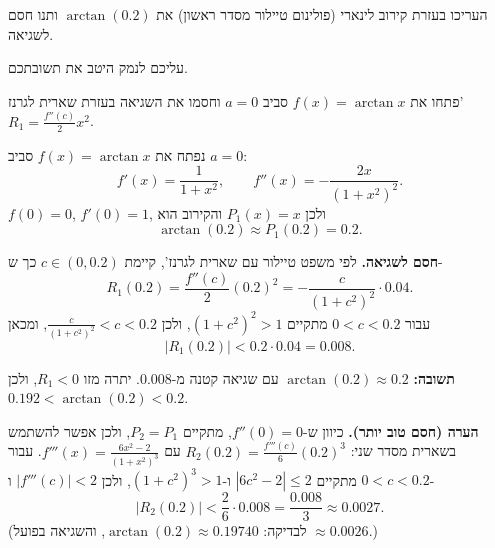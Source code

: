 
\begin{question}
העריכו בעזרת קירוב לינארי (פולינום טיילור מסדר ראשון) את $\arctan(0.2)$ ותנו חסם לשגיאה.

עליכם לנמק היטב את תשובתכם.
\end{question}

\begin{hint}
פתחו את $f(x)=\arctan x$ סביב $a=0$ וחסמו את השגיאה בעזרת שארית לגרנז' $R_1=\frac{f''(c)}{2}x^2$.
\end{hint}

\begin{solution}
נפתח את $f(x)=\arctan x$ סביב $a=0$:
\[ f'(x)=\frac{1}{1+x^2},\qquad f''(x)=-\frac{2x}{(1+x^2)^2}. \]
$f(0)=0$, $f'(0)=1$, ולכן $P_1(x)=x$ והקירוב הוא
\[ \arctan(0.2)\approx P_1(0.2)=\boxed{0.2}. \]

\textbf{חסם לשגיאה.} לפי משפט טיילור עם שארית לגרנז', קיימת $c\in(0,0.2)$ כך ש-
\[ R_1(0.2)=\frac{f''(c)}{2}(0.2)^2=-\frac{c}{(1+c^2)^2}\cdot0.04. \]
עבור $0<c<0.2$ מתקיים $(1+c^2)^2>1$, ולכן $\frac{c}{(1+c^2)^2}<c<0.2$, ומכאן
\[ |R_1(0.2)|<0.2\cdot0.04=0.008. \]

\textbf{תשובה:} $\arctan(0.2)\approx0.2$ עם שגיאה קטנה מ-$0.008$. יתרה מזו $R_1<0$, ולכן $0.192<\arctan(0.2)<0.2$.

\textbf{הערה (חסם טוב יותר).} כיוון ש-$f''(0)=0$, מתקיים $P_2=P_1$, ולכן אפשר להשתמש בשארית מסדר שני: $R_2(0.2)=\frac{f'''(c)}{6}(0.2)^3$ עם $f'''(x)=\frac{6x^2-2}{(1+x^2)^3}$. עבור $0<c<0.2$ מתקיים $|6c^2-2|\le 2$ ו-$(1+c^2)^3>1$, ולכן $|f'''(c)|<2$ ו-
\[ |R_2(0.2)|<\frac{2}{6}\cdot0.008=\frac{0.008}{3}\approx0.0027. \]
(לבדיקה: $\arctan(0.2)\approx0.19740$, והשגיאה בפועל $\approx0.0026$.)
\end{solution}
